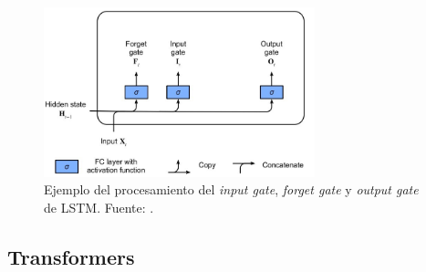 \begin{figure}[H]
	\centering
	\includegraphics[width=0.7\textwidth]{../img/neoantigen/lstm}
	\caption{Ejemplo del procesamiento del \textit{input gate}, \textit{forget gate} y \textit{output gate} de LSTM. Fuente: \cite{zhang2021dive}.}
	\label{fig:lstm}
\end{figure}

\subsection{Transformers}


